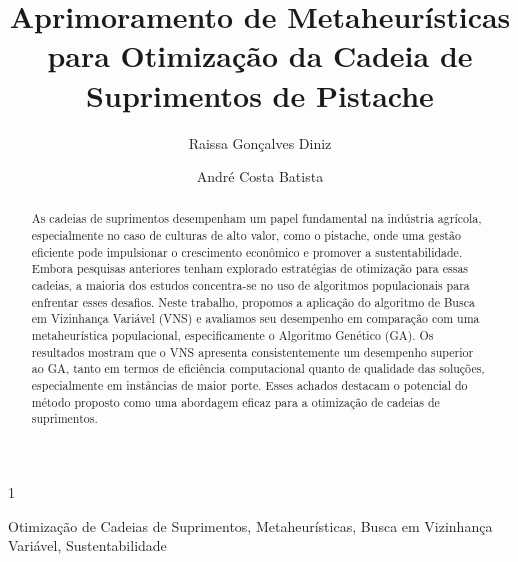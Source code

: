 \documentclass[a4paper]{ifacconf}
\def\portugues{1}
\def\portugues{0}
\begin{document}
\if\portugues1
% 

\begin{frontmatter}

\title{Aprimoramento de Metaheurísticas para Otimização da Cadeia de Suprimentos de Pistache}

\author[First]{Raissa Gon\c{c}alves Diniz} 
\author[Second]{Andr\'e Costa Batista} 

\address[First]{Laboratório de Pesquisa Operacional e Sistemas Complexos, Universidade Federal de Minas Gerais, Brasil (e-mail: raissagd@ufmg.br).}
\address[Second]{Departamento de Engenharia Elétrica, Universidade Federal de Minas Gerais, Av. Ant\^onio Carlos 6627, Belo Horizonte, 31270-010, Minas Gerais, Brasil (e-mail: andre-costa@ufmg.br).}

\renewcommand{\abstractname}{{\bf Resumo:~}}   

\begin{abstract}                
As cadeias de suprimentos desempenham um papel fundamental na indústria agrícola, especialmente no caso de culturas de alto valor, como o pistache, onde uma gestão 
eficiente pode impulsionar o crescimento econômico e promover a sustentabilidade. Embora pesquisas anteriores tenham explorado estratégias de otimização para essas 
cadeias, a maioria dos estudos concentra-se no uso de algoritmos populacionais para enfrentar esses desafios. Neste trabalho, propomos a aplicação do algoritmo de 
Busca em Vizinhança Variável (VNS) e avaliamos seu desempenho em comparação com uma metaheurística populacional, especificamente o Algoritmo Genético (GA). Os resultados
mostram que o VNS apresenta consistentemente um desempenho superior ao GA, tanto em termos de eficiência computacional quanto de qualidade das soluções, especialmente 
em instâncias de maior porte. Esses achados destacam o potencial do método proposto como uma abordagem eficaz para a otimização de cadeias de suprimentos.
\end{abstract}

\begin{keyword}
Otimização de Cadeias de Suprimentos, Metaheurísticas, Busca em Vizinhança Variável, Sustentabilidade
\end{keyword}

\end{frontmatter}
\end{document}
